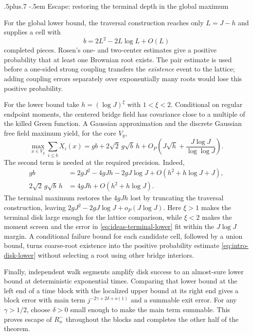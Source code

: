 \documentclass[12pt,reqno]{amsart}
\makeatletter
\def\subsection{\@startsection{subsection}{2}{0pt}%
  {.5\linespacing plus.7\linespacing}
  {-.5em}
  {\normalfont\scshape}}
\theoremstyle{plain}
\theoremstyle{definition}
\theoremstyle{remark}
\numberwithin{equation}{section}
\makeatother
\begin{document}
\subsection{Escape: restoring the terminal depth in the global maximum}

For the global lower bound, the traversal construction reaches only
$L=J-h$ and supplies a cell with
\begin{equation}\label{eq:ideas-coarse-count}
 b=2L^2-2L\log L+O(L)
\end{equation}
completed pieces. Rosen's one- and two-center estimates give a positive
probability that at least one Brownian root exists. The pair estimate is
used before a one-sided strong coupling transfers the
\emph{existence} event to the lattice; adding coupling errors separately
over exponentially many roots would lose this positive probability.

For the lower bound take $h=(\log J)^\xi$ with $1<\xi<2$. Conditional on
regular endpoint moments, the centered bridge field has covariance close
to a multiple of the killed Green function. A Gaussian approximation and
the discrete Gaussian free field maximum yield, for the core $V_y$,
\begin{equation}\label{eq:ideas-terminal-lower}
 \max_{x\in V_y}\sum_{i\le b}X_i(x)
 =gb+2\sqrt2\,g\sqrt b\,h
 +O_P\left(J\sqrt h+\frac{J\log J}{\log\log J}\right).
\end{equation}
The second term is needed at the required precision. Indeed,
\begin{align*}
 gb&=2gJ^2-4gJh-2gJ\log J+O(h^2+h\log J+J),\\
 2\sqrt2\,g\sqrt b\,h&=4gJh+O(h^2+h\log J).
\end{align*}
The terminal maximum restores the $4gJh$ lost by truncating the
traversal construction, leaving
$2gJ^2-2gJ\log J+o_P(J\log J)$. Here $\xi>1$ makes the terminal disk
large enough for the lattice comparison, while $\xi<2$ makes the moment
screen and the error in \eqref{eq:ideas-terminal-lower} fit within the
$J\log J$ margin. A conditional failure bound for each candidate cell,
followed by a union bound, turns coarse-root existence into the positive
probability estimate \eqref{eq:intro-disk-lower} without selecting a root
using other bridge interiors.

Finally, independent walk segments amplify disk success to an almost-sure
lower bound at deterministic exponential times. Comparing that lower bound
at the left end of a time block with the localized upper bound at its right
end gives a block error with main term
$j^{-2\gamma+2\delta+o(1)}$ and a summable exit error. For any
$\gamma>1/2$, choose $\delta>0$ small enough to make the main term
summable. This proves escape of $R_n^-$ throughout the blocks and
completes the other half of the theorem.
\end{document}
